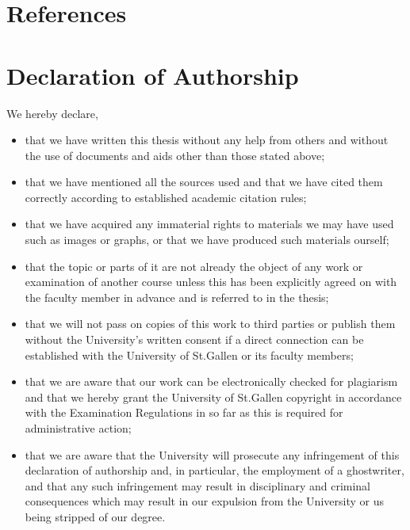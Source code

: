 \documentclass[a4paper,12pt]{article}
\begin{document}
\section{References}
\printbibliography[heading=none]
\clearpage

\section{Declaration of Authorship}
We hereby declare,

\begin{itemize}
	\item that we have written this thesis without any help from others and without the use of documents and aids other than those stated above;
	\item that we have mentioned all the sources used and that we have cited them correctly according to established academic citation rules;
    \item that we have acquired any immaterial rights to materials we may have used such as images or graphs, or that we have produced such materials ourself;
    \item that the topic or parts of it are not already the object of any work or examination of another course unless this has been explicitly agreed on with the faculty member in advance and is referred to in the thesis;
    \item that we will not pass on copies of this work to third parties or publish them without the University’s written consent if a direct connection can be established with the University of St.Gallen or its faculty members;
    \item that we are aware that our work can be electronically checked for plagiarism and that we hereby grant the University of St.Gallen copyright in accordance with the Examination Regulations in so far as this is required for administrative action;
    \item that we are aware that the University will prosecute any infringement of this declaration of authorship and, in particular, the employment of a ghostwriter, and that any such infringement may result in disciplinary and criminal consequences which may result in our expulsion from the University or us being stripped of our degree.
\end{itemize}
\end{document}

